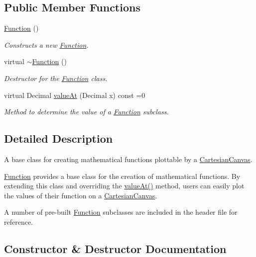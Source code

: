 \subsection*{Public Member Functions}
\begin{DoxyCompactItemize}
\item 
\hyperlink{classtsgl_1_1_function_aaf959c9d39bb45c2aded83fd754c288d}{Function} ()
\begin{DoxyCompactList}\small\item\em Constructs a new \hyperlink{classtsgl_1_1_function}{Function}. \end{DoxyCompactList}\item 
virtual \hyperlink{classtsgl_1_1_function_a3b8cbd26a32c6ae75b12e7397bb42c41}{$\sim$\+Function} ()
\begin{DoxyCompactList}\small\item\em Destructor for the \hyperlink{classtsgl_1_1_function}{Function} class. \end{DoxyCompactList}\item 
virtual Decimal \hyperlink{classtsgl_1_1_function_affb7b3b19a04efefa29a9870d666e912}{value\+At} (Decimal x) const =0
\begin{DoxyCompactList}\small\item\em Method to determine the value of a \hyperlink{classtsgl_1_1_function}{Function} subclass. \end{DoxyCompactList}\end{DoxyCompactItemize}


\subsection{Detailed Description}
A base class for creating mathematical functions plottable by a \hyperlink{classtsgl_1_1_cartesian_canvas}{Cartesian\+Canvas}. 

\hyperlink{classtsgl_1_1_function}{Function} provides a base class for the creation of mathematical functions. By extending this class and overriding the \hyperlink{classtsgl_1_1_function_affb7b3b19a04efefa29a9870d666e912}{value\+At()} method, users can easily plot the values of their function on a \hyperlink{classtsgl_1_1_cartesian_canvas}{Cartesian\+Canvas}.

A number of pre-\/built \hyperlink{classtsgl_1_1_function}{Function} subclasses are included in the header file for reference. 

\subsection{Constructor \& Destructor Documentation}
\hypertarget{classtsgl_1_1_function_aaf959c9d39bb45c2aded83fd754c288d}{}
